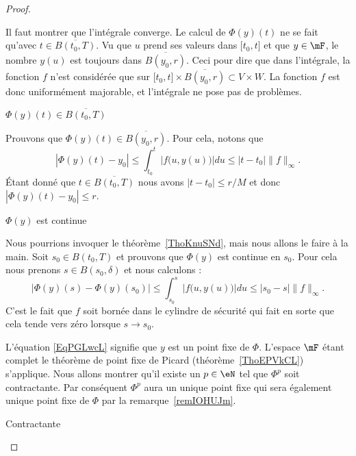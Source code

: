 \begin{proof}
\begin{subproof}
\begin{subproof}
        Il faut montrer que l'intégrale converge. Le calcul de \( \Phi(y)(t)\) ne se fait qu'avec \( t\in \overline{ B(t_0,T) }\). Vu que \( u\) prend ses valeurs dans \( \mathopen[ t_0 , t \mathclose]\) et que \( y\in\mF\), le nombre \( y(u)\) est toujours dans \( \overline{ B(y_0,r) }\). Ceci pour dire que dans l'intégrale, la fonction \( f\) n'est considérée que sur \( \mathopen[ t_0 , t \mathclose]\times \overline{ B(y_0,r) }\subset V\times W\). La fonction \( f\) est donc uniformément majorable, et l'intégrale ne pose pas de problèmes.

    \item[\( \Phi(y)(t)\in \overline{ B(t_0,T) }\)]

    Prouvons que \( \Phi(y)(t)\in\overline{ B(y_0,r) }\). Pour cela, notons que
    \begin{equation}
        | \Phi(y)(t)-y_0 |\leq \int_{t_0}^t |f\big( u,y(u) \big)|du\leq | t-t_0 |\| f \|_{\infty}.
    \end{equation}
    Étant donné que \( t\in\overline{ B(t_0,T) }\) nous avons \( | t-t_0 |\leq r/M\) et donc \( | \Phi(y)(t)-y_0 |\leq r\).

    \item[\( \Phi(y)\) est continue]

        Nous pourrions invoquer le théorème~\ref{ThoKnuSNd}, mais nous allons le faire à la main. Soit \( s_0\in B(t_0,T)\) et prouvons que \( \Phi(y)\) est continue en \( s_0\). Pour cela nous prenons \( s\in B(s_0,\delta)\) et nous calculons :
        \begin{equation}
            | \Phi(y)(s)-\Phi(y)(s_0) |\leq \int_{s_0}^s|f\big( u,y(u) \big)|du\leq | s_0-s |\| f \|_{\infty}.
        \end{equation}
        C'est le fait que \( f\) soit bornée dans le cylindre de sécurité qui fait en sorte que cela tende vers zéro lorsque \( s\to s_0\).
    \end{subproof}

    L'équation \eqref{EqPGLwcL} signifie que \( y\) est un point fixe de \( \Phi\). L'espace \( \mF\) étant complet le théorème de point fixe de Picard (théorème~\ref{ThoEPVkCL}) s'applique. Nous allons montrer qu'il existe un \( p\in\eN\) tel que \( \Phi^p\) soit contractante. Par conséquent \( \Phi^p\) aura un unique point fixe qui sera également unique point fixe de \( \Phi\) par la remarque~\ref{remIOHUJm}.

\item[Contractante]


\end{subproof}
\end{proof}
